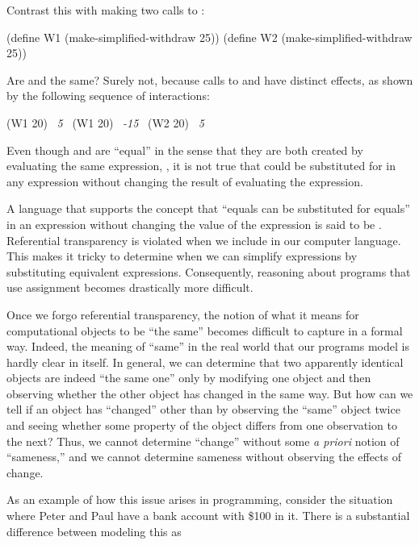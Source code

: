 Contrast this with making two calls to :

\begin{codeBlock}
(define W1 (make-simplified-withdraw 25))
(define W2 (make-simplified-withdraw 25))
\end{codeBlock}

\noindent
Are  and  the same?  Surely not, because calls to 
and  have distinct effects, as shown by the following sequence of
interactions:

\begin{codeBlock}
(W1 20)
~\textit{5}~
(W1 20)
~\textit{-15}~
(W2 20)
~\textit{5}~
\end{codeBlock}

\noindent
Even though  and  are ``equal'' in the sense that they are
both created by evaluating the same expression, , it is not true that  could be substituted for  in any
expression without changing the result of evaluating the expression.

A language that supports the concept that ``equals can be substituted for
equals'' in an expression without changing the value of the expression is said
to be .  Referential transparency is
violated when we include  in our computer language.  This makes it
tricky to determine when we can simplify expressions by substituting equivalent
expressions.  Consequently, reasoning about programs that use assignment
becomes drastically more difficult.

Once we forgo referential transparency, the notion of what it means for
computational objects to be ``the same'' becomes difficult to capture in a
formal way.  Indeed, the meaning of ``same'' in the real world that our
programs model is hardly clear in itself.  In general, we can determine that
two apparently identical objects are indeed ``the same one'' only by modifying
one object and then observing whether the other object has changed in the same
way.  But how can we tell if an object has ``changed'' other than by observing
the ``same'' object twice and seeing whether some property of the object
differs from one observation to the next?  Thus, we cannot determine ``change''
without some \emph{a priori} notion of ``sameness,'' and we cannot determine
sameness without observing the effects of change.

As an example of how this issue arises in programming, consider the situation
where Peter and Paul have a bank account with \$100 in it.  There is a
substantial difference between modeling this as

